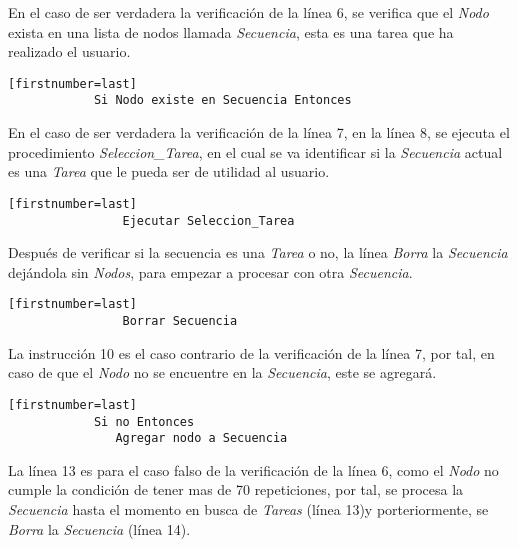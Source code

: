 En el caso de ser verdadera la verificaci\'on de la l\'inea 6, se verifica 
 que el \emph{Nodo} exista en una lista de nodos llamada \emph{Secuencia}, 
 esta es una tarea que ha realizado el usuario.

\begin{tiny}
\begin{lstlisting}[name=EXmonitor][firstnumber=last]
            Si Nodo existe en Secuencia Entonces
\end{lstlisting}
\end{tiny}

En el caso de ser verdadera la verificaci\'on de la l\'inea 7, en la l\'inea
 8, se ejecuta el procedimiento \emph{Seleccion\_Tarea}, en el cual se va  
 identificar si la \emph{Secuencia} actual es una \emph{Tarea} que le pueda 
 ser de utilidad al usuario. 

\begin{tiny}
\begin{lstlisting}[name=EXmonitor][firstnumber=last]         
                Ejecutar Seleccion_Tarea
\end{lstlisting}
\end{tiny}

Despu\'es de verificar si la secuencia es una \emph{Tarea} o no, la l\'inea
 \emph{Borra} la \emph{Secuencia} dej\'andola sin \emph{Nodos}, para empezar a
 procesar con otra \emph{Secuencia}.

\begin{tiny}
\begin{lstlisting}[name=EXmonitor][firstnumber=last]         
                Borrar Secuencia
\end{lstlisting}
\end{tiny}

La instrucci\'on 10 es el caso contrario de la verificaci\'on de la l\'inea
 7, por tal, en caso de que el \emph{Nodo} no se encuentre en la 
 \emph{Secuencia}, este se agregar\'a.

\begin{tiny}
\begin{lstlisting}[name=EXmonitor][firstnumber=last]        
            Si no Entonces
               Agregar nodo a Secuencia
\end{lstlisting}
\end{tiny}

La l\'inea 13 es para el caso falso de la verificaci\'on de la l\'inea 6, 
 como el \emph{Nodo} no cumple la condici\'on de tener mas de 70 
 repeticiones, por tal, se procesa la \emph{Secuencia} hasta el momento en
  busca de \emph{Tareas} (l\'inea 13)y porteriormente, se \emph{Borra} la 
  \emph{Secuencia} (l\'inea 14).

